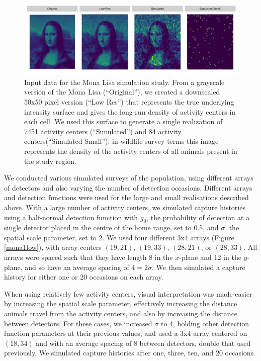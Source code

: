 \documentclass[a4paper,12pt]{article}
\begin{document}
\begin{figure}[htbp]
\centering
\includegraphics[width=1\textwidth]{mona_inputdata.png}
\caption{Input data for the Mona Lisa simulation study. From a grayscale version of the Mona Lisa (``Original''), we created a downscaled 50x50 pixel version (``Low Res'') that represents the true underlying intensity surface and gives the long-run density of activity centers in each cell. We used this surface to generate a single realization of 7451 activity centers (``Simulated'') and 84 activity centers(``Simulated Small''); in wildlife survey terms this image represents the density of the activity centers of all animals present in the study region.}
\label{mlinputs}
\end{figure}

We conducted various simulated surveys of the population, using different arrays of detectors and also varying the number of detection occasions. Different arrays and detection functions were used for the large and small realisations described above. With a large number of activity centers, we simulated capture histories using a half-normal detection function with $g_0$, the probability of detection at a single detector placed in the centre of the home range, set to 0.5, and $\sigma$, the spatial scale parameter, set to 2. We used four different 3x4 arrays (Figure \ref{mona1low}), with array centers $(19,21)$, $(19,33)$, $(28, 21)$, or $(28, 33)$. All arrays were spaced such that they have length 8 in the $x$-plane and 12 in the $y$-plane, and so have an average spacing of $4=2\sigma$. We then simulated a capture history for either one or 20 occasions on each array.

When using relatively few activity centers, visual interpretation was made easier by increasing the spatial scale parameter, effectively increasing the distance animals travel from the activity centers, and also by increasing the distance between detectors. For these cases, we increased $\sigma$ to 4, holding other detection function parameters at their previous values, and used a 3x4 array centered on $(18,34)$ and with an average spacing of 8 between detectors, double that used previously. We simulated capture histories after one, three, ten, and 20 occasions. 
\end{document}
